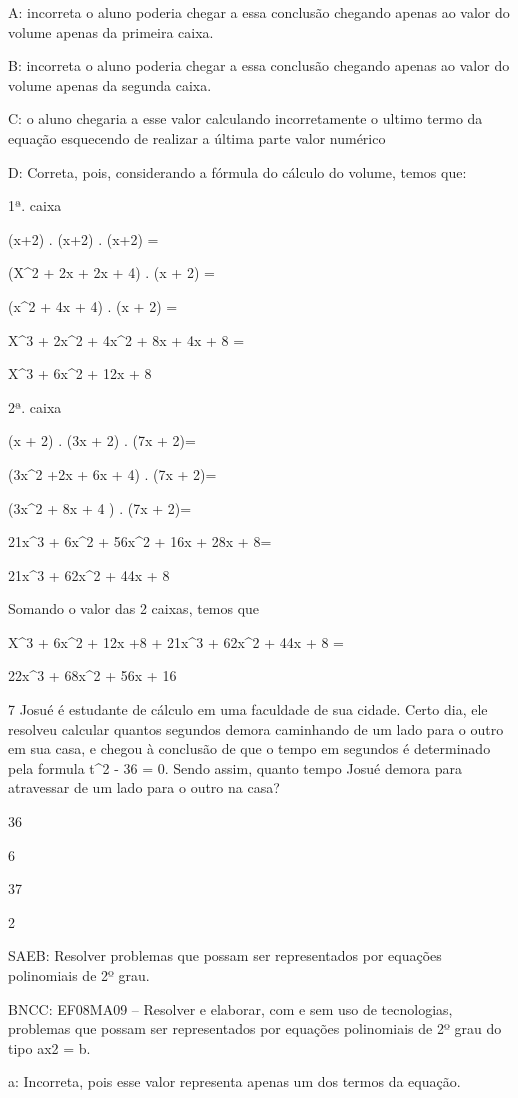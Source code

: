 {A: incorreta o aluno poderia chegar a essa conclusão chegando apenas ao
valor do volume apenas da primeira caixa.

B: incorreta o aluno poderia chegar a essa conclusão chegando apenas ao
valor do volume apenas da segunda caixa.

C: o aluno chegaria a esse valor calculando incorretamente o ultimo
termo da equação esquecendo de realizar a última parte valor numérico

D: Correta, pois, considerando a fórmula do cálculo do volume, temos
que:

1ª. caixa

(x+2) . (x+2) . (x+2) =

(X^2 + 2x + 2x + 4) . (x + 2) =

(x^2 + 4x + 4) . (x + 2) =

X^3 + 2x^2 + 4x^2 + 8x + 4x + 8 =

X^3 + 6x^2 + 12x + 8

2ª. caixa

(x + 2) . (3x + 2) . (7x + 2)=

(3x^2 +2x + 6x + 4) . (7x + 2)=

(3x^2 + 8x + 4 ) . (7x + 2)=

21x^3 + 6x^2 + 56x^2 + 16x + 28x + 8=

21x^3 + 62x^2 + 44x + 8

Somando o valor das 2 caixas, temos que

X^3 + 6x^2 + 12x +8 + 21x^3 + 62x^2 + 44x + 8 =

22x^3 + 68x^2 + 56x + 16

\num{7} Josué é estudante de cálculo em uma faculdade de sua cidade. Certo
dia, ele resolveu calcular quantos segundos demora caminhando de um lado
para o outro em sua casa, e chegou à conclusão de que o tempo em
segundos é determinado pela formula t^2 - 36 = 0. Sendo assim, quanto
tempo Josué demora para atravessar de um lado para o outro na casa?
\item 36
\item 6
\item 37
\item 2

SAEB: Resolver problemas que possam ser representados por equações
polinomiais de 2º grau.

BNCC: EF08MA09 -- Resolver e elaborar, com e sem uso de tecnologias,
problemas que possam ser representados por equações polinomiais de 2º
grau do tipo ax2 = b.

a: Incorreta, pois esse valor representa apenas um dos termos da
equação.

}
